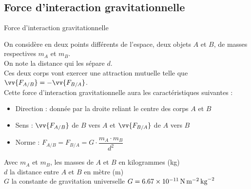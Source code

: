 \documentclass{beamer}
\begin{document}
 \subsection{Force d'interaction gravitationnelle}
    \begin{frame}{Force d'interaction gravitationnelle}
    \begin{minipage}{\linewidth}
    \small
    On considère en deux points différents de l'espace, deux objets $A$ et $B$, de masses respectives $m_A$ et $m_B$.\\
    On note la distance qui les sépare $d$.\\
    Ces deux corps vont exercer une attraction mutuelle telle que $\vv{F_{A/B}} = -\vv{F_{B/A}}$.\\
    Cette force d'interaction gravitationnelle aura les caractéristiques suivantes :
        \begin{itemize}
            \item[$-$] Direction : donnée par la droite reliant le centre des corps $A$ et $B$
            \item[$-$] Sens : $\vv{F_{A/B}}$ de $B$ vers $A$ et  $\vv{F_{B/A}}$ de $A$ vers $B$
            \item[$-$] Norme : $F_{A/B} = F_{B/A} = G\cdot \dfrac{m_A\cdot m_B}{d^2}$ 
        \end{itemize}
    Avec $m_A$ et $m_B$, les masses de $A$ et $B$ en kilogrammes (\unit{kg})\\
    $d$ la distance entre $A$ et $B$ en mètre (\unit{\meter})\\
    $G$ la constante de gravitation universelle $G = \SI{6,67E-11}{\newton\per\meter\squared\per\kilo\gram\squared}$
    \end{minipage}
    
    \end{frame}
    
\end{document}
